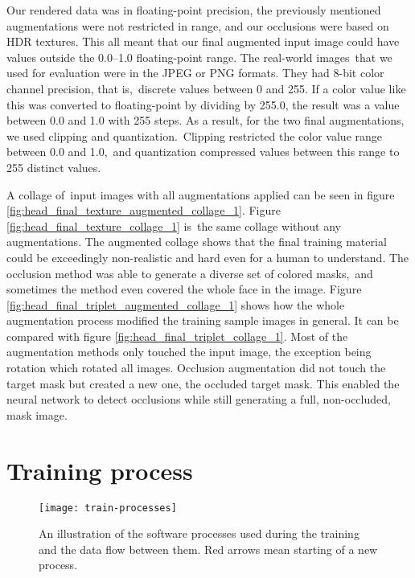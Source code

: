 Our rendered data was in floating-point precision, the previously mentioned augmentations were not restricted in range, and our occlusions were based on \ac{HDR} textures. This all meant that our final augmented input image could have values outside the 0.0--1.0 floating-point range. The real-world images that we used for evaluation were in the JPEG or PNG formats. They had 8-bit color channel precision, that is, discrete values between 0 and 255. If a color value like this was converted to floating-point by dividing by 255.0, the result was a value between 0.0 and 1.0 with 255 steps. As a result, for the two final augmentations, we used clipping and quantization. Clipping restricted the color value range between 0.0 and 1.0, and quantization compressed values between this range to 255 distinct values.

A collage of input images with all augmentations applied can be seen in figure \ref{fig:head_final_texture_augmented_collage_1}. Figure \ref{fig:head_final_texture_collage_1} is the same collage without any augmentations. The augmented collage shows that the final training material could be exceedingly non-realistic and hard even for a human to understand. The occlusion method was able to generate a diverse set of colored masks, and sometimes the method even covered the whole face in the image. Figure \ref{fig:head_final_triplet_augmented_collage_1} shows how the whole augmentation process modified the training sample images in general. It can be compared with figure \ref{fig:head_final_triplet_collage_1}. Most of the augmentation methods only touched the input image, the exception being rotation which rotated all images. Occlusion augmentation did not touch the target mask but created a new one, the occluded target mask. This enabled the neural network to detect occlusions while still generating a full, non-occluded, mask image.

\section{Training process}
\label{sec:training_process}

\begin{figure}
    \texttt{[image: train-processes]}
    \caption[Training software processes]{An illustration of the software processes used during the training and the data flow between them. Red arrows mean starting of a new process.}
    \label{fig:train_processes_1}
\end{figure}

